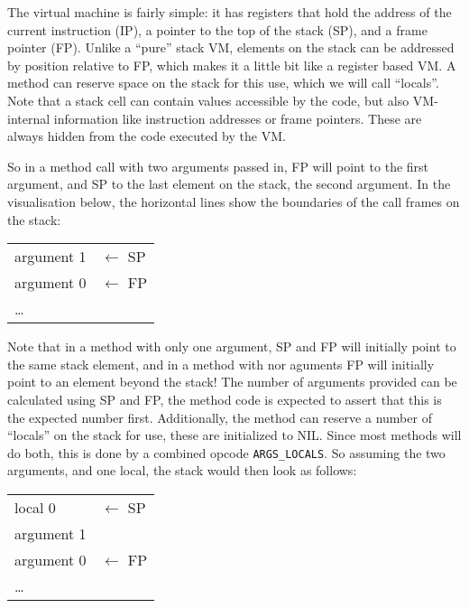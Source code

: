 \documentclass[12pt,a4paper]{article}
\begin{document}
The virtual machine is fairly simple: it has registers that hold the address of the current instruction (IP), a pointer to the top of the stack (SP), and a frame pointer (FP). Unlike a ``pure'' stack VM, elements on the stack can be addressed by position relative to FP, which makes it a little bit like a register based VM. A method can reserve space on the stack for this use, which we will call ``locals''. Note that a stack cell can contain values accessible by the code, but also VM-internal information like instruction addresses or frame pointers. These are always hidden from the code executed by the VM.

So in a method call with two arguments passed in, FP will point to the first argument, and SP to the last element on the stack, the second argument. In the visualisation below, the horizontal lines show the boundaries of the call frames on the stack:

\begin{table}[h]
\centering
\begin{tabular}{|p{3cm}|p{3cm}}
argument 1 & $\leftarrow$ SP \\
argument 0 & $\leftarrow$ FP \\
\cline{1-1}
\ldots & \\
\end{tabular}
\end{table}

Note that in a method with only one argument, SP and FP will initially point to the same stack element, and in a method with nor aguments FP will initially point to an element beyond the stack! The number of arguments provided can be calculated using SP and FP, the method code is expected to assert that this is the expected number first. Additionally, the method can reserve a number of ``locals'' on the stack for use, these are initialized to NIL. Since most methods will do both, this is done by a combined opcode \verb|ARGS_LOCALS|. So assuming the two arguments, and one local, the stack would then look as follows:

\begin{table}[h]
\centering
\begin{tabular}{|p{3cm}|p{3cm}}
local 0 & $\leftarrow$ SP \\
argument 1 \\ 
argument 0 & $\leftarrow$ FP \\
\cline{1-1}
\ldots & \\
\end{tabular}
\end{table}
\end{document}

